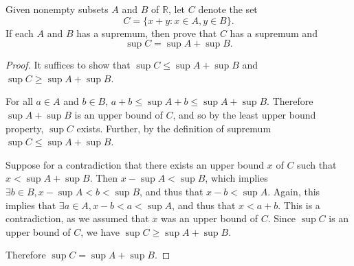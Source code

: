 \documentclass{article}
\newcommand{\R}{\mathbb{R}}
\newenvironment{problem}[2][Problem]{\begin{trivlist}
\item[\hskip \labelsep {\bfseries #1}\hskip \labelsep {\bfseries #2.}]}{\end{trivlist}}
\begin{document}
\begin{problem}{2}
    Given nonempty subsets $A$ and $B$ of $\R$, let $C$ denote the set
    $$C = \{x + y : x \in A, y \in B\}.$$
    If each $A$ and $B$ has a supremum, then prove that $C$ has a supremum and
    $$\sup C = \sup A + \sup B.$$    
\end{problem}
\begin{proof}
    It suffices to show that $\sup C \le \sup A + \sup B$ and $\sup C \ge \sup A + \sup B$.

    For all $a \in A$ and $b \in B$, $a + b \le \sup A + b \le \sup A + \sup B$. Therefore $\sup A + \sup B$ is an upper bound of $C$, and so by the least upper bound property, $\sup C$ exists. Further, by the definition of supremum $\sup C \le \sup A + \sup B$.

    Suppose for a contradiction that there exists an upper bound $x$ of $C$ such that $x < \sup A + \sup B$. Then $x - \sup A < \sup B$, which implies $\exists b \in B, x - \sup A < b < \sup B$, and thus that $x - b < \sup A$. Again, this implies that $\exists a \in A, x - b < a < \sup A$, and thus that $x < a + b$. This is a contradiction, as we assumed that $x$ was an upper bound of $C$. Since $\sup C$ is an upper bound of $C$, we have $\sup C \ge \sup A + \sup B$.

    Therefore $\sup C = \sup A + \sup B$.
\end{proof}

\end{document}
